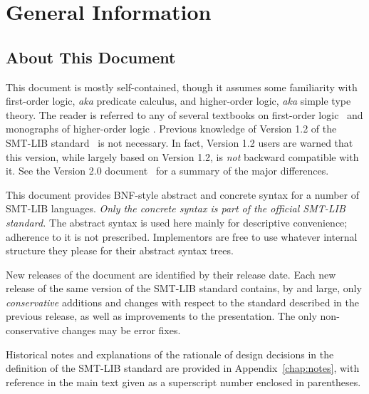 

\chapter{General Information}
\thispagestyle{empty}


\section{About This Document}

This document is mostly self-contained, though 
it assumes some familiarity with first-order logic, \emph{aka} predicate calculus,
and higher-order logic, \emph{aka} simple type theory.
The reader is referred to any of several textbooks 
on first-order logic~\cite{Gal-86,Fit-96,Hen-01,Men-09} and 
monographs of higher-order logic . 
Previous knowledge of Version 1.2 of the SMT-LIB standard~\cite{RanTin-RR-06}
is not necessary.
In fact, Version 1.2 users are warned that this version,
while largely based on Version 1.2, 
is \emph{not} backward compatible with it.
See the Version 2.0 document~\cite{BarST-RR-10} for a summary of the major differences.

This document provides BNF-style abstract and concrete syntax 
for a number of SMT-LIB languages.
\emph{Only the concrete syntax is part of the official SMT-LIB standard.}
The abstract syntax is used here mainly for descriptive convenience;
adherence to it is not prescribed.
Implementors are free to use whatever internal structure 
they please for their abstract syntax trees.
\medskip

New releases of the document are identified by their release date.
Each new release of the same version of the SMT-LIB standard 
contains, by and large, only \emph{conservative} additions and 
changes with respect to the standard described in the previous release,
as well as improvements to the presentation.
The only non-conservative changes may be error fixes.

Historical notes and 
explanations of the rationale of design decisions
in the definition of the SMT-LIB standard are provided 
in Appendix~\ref{chap:notes}, 
with reference in the main text given as a superscript number 
enclosed in parentheses.

